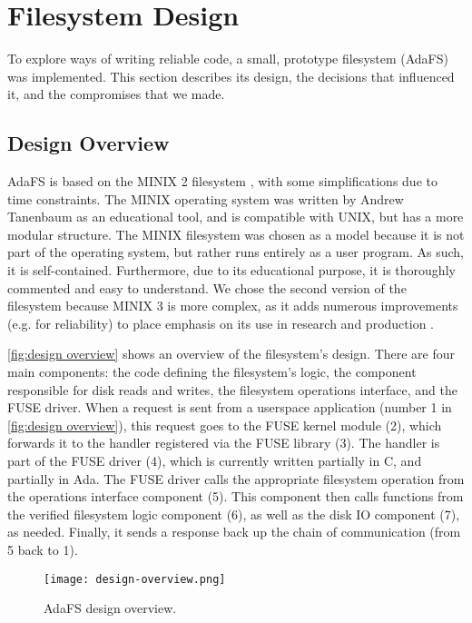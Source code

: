 \section{Filesystem Design}
To explore ways of writing reliable code, a small, prototype filesystem (AdaFS) was implemented.
This section describes its design, the decisions that influenced it, and the compromises that we made.

\subsection{Design Overview}
AdaFS is based on the MINIX 2 filesystem \cite{tanenbaum1997}, with some simplifications due to time constraints.
The MINIX operating system was written by Andrew Tanenbaum as an educational tool, and is compatible with UNIX, but has a more modular structure.
The MINIX filesystem was chosen as a model because it is not part of the operating system, but rather runs entirely as a user program.
As such, it is self-contained.
Furthermore, due to its educational purpose, it is thoroughly commented and easy to understand.
We chose the second version of the filesystem because MINIX 3 is more complex, as it adds numerous improvements (e.g. for reliability) to place emphasis on its use in research and production \cite{minix3history}.

\autoref{fig:design overview} shows an overview of the filesystem's design.
There are four main components: the code defining the filesystem's logic, the component responsible for disk reads and writes, the filesystem operations interface, and the FUSE driver.
When a request is sent from a userspace application (number 1 in \autoref{fig:design overview}), this request goes to the FUSE kernel module (2), which forwards it to the handler registered via the FUSE library (3).
The handler is part of the FUSE driver (4), which is currently written partially in C, and partially in Ada.
The FUSE driver calls the appropriate filesystem operation from the operations interface component (5).
This component then calls functions from the verified filesystem logic component (6), as well as the disk IO component (7), as needed.
Finally, it sends a response back up the chain of communication (from 5 back to 1).

\begin{figure}[tb]
  \centering
  \texttt{[image: design-overview.png]}
  \caption{AdaFS design overview.}
  \label{fig:design overview}
\end{figure}


